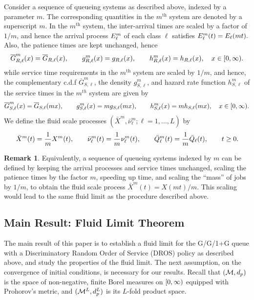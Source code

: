\documentclass{article}
\theoremstyle{definition}
\newtheorem{remark}[theorem]{Remark}
\numberwithin{equation}{section}
\begin{document}
Consider a sequence of queueing systems as described above, indexed by a parameter $m$. The corresponding quantities in the $m^\text{th}$ system are denoted by a superscript $m$. In the $m^\text{th}$ system, the inter-arrival times are scaled by a factor of $1/m$, and hence the arrival process $E^m_\ell$ of each class $\ell$ satisfies $E^m_\ell(t)=E_\ell(mt).$ Also, the patience times are kept unchanged, hence
\[
    \overline G^m_{R,\ell}(x)=\overline G_{R,\ell}(x),\quad\quad g^m_{R,\ell}(x)=g_{R,\ell}(x),\quad\quad h^m_{R,\ell}(x)=h_{R,\ell}(x),\quad x\in[0,\infty).
\]
while service time requirements in the $m^\text{th}$ system are scaled by $1/m$, and hence, the complementary c.d.f $\overline G^m_{S,\ell}$, the density $g^m_{S,\ell}$, and hazard rate function $h^m_{S,\ell}$ of the service times in the $m^{th}$ system are given by
\[
    \overline G^m_{S,\ell}(x)=\overline G_{S,\ell}(mx),\quad\quad g^m_{S,\ell}(x)=m g_{S,\ell}(mx),\quad\quad h^m_{S,\ell}(x)=mh_{S,\ell}(mx),\quad x\in[0,\infty).
\]
We define the fluid scale processes $(\bar X^m, \bar\nu^m_\ell;\ell=1,...,L )$ by
\[
    \bar X^m(t)=\frac{1}{m}X^m(t),\quad \quad \bar\nu^m_\ell(t)=\frac{1}{m}\nu^m_\ell(t),\quad\quad \bar {Q}^m_\ell(t)=\frac{1}{m}\bar {Q}_\ell(t),\quad\quad t\geq0.
\]


\begin{remark}
  Equivalently, a sequence of queueing systems indexed by $m$ can be defined by keeping the arrival processes and service times unchanged, scaling the patience times by the factor $m$, speeding up time, and scaling the ``mass'' of jobs by $1/m$, to obtain the fluid scale process $\bar X^m(t)=X(mt)/m$. This scaling would lead to the same fluid limit as the procedure described above.
\end{remark}

\subsection{Main Result: Fluid Limit Theorem}

The main result of this paper is to establish a fluid limit for the G/G/1+G queue with a Discriminatory Random Order of Service (DROS) policy as described above, and study the properties of the fluid limit. The next assumption, on the convergence of initial conditions, is necessary for our results. Recall that $(\mathcal{M},d_p)$ is the space of non-negative, finite Borel measures on $[0,\infty)$ equipped with Prohorov's metric, and $(\mathcal{M}^L,d_p^L)$ is its $L$-fold product space.
\end{document}

